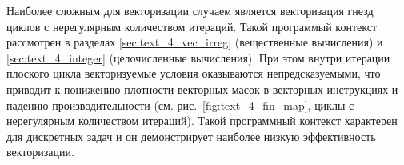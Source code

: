 Наиболее сложным для векторизации случаем является векторизация гнезд циклов с нерегулярным количеством итераций.
Такой программый контекст рассмотрен в разделах \ref{sec:text_4_vec_irreg} (вещественные вычисления) и \ref{sec:text_4_integer} (целочисленные вычисления).
При этом внутри итерации плоского цикла векторизуемые условия оказываются непредсказуемыми, что приводит к понижению плотности векторных масок в векторных инструкциях и падению производительности (см. рис.~\ref{fig:text_4_fin_map}, циклы с нерегулярным количеством итераций).
Такой программный контекст характерен для дискретных задач и он демонстрирует наиболее низкую эффективность векторизации.

